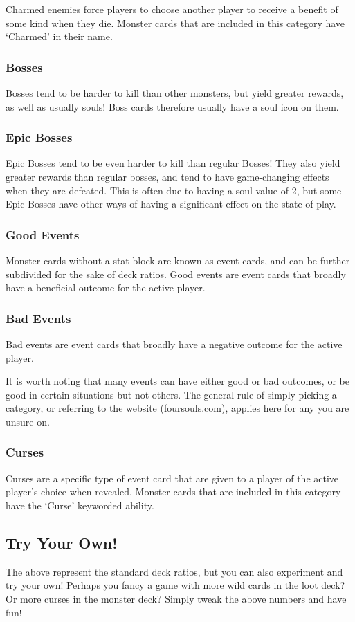 \documentclass[10pt, a4paper, twoside]{article} %
\begin{document}
    Charmed enemies force players to choose another player to receive a benefit of some kind when they die. Monster cards that are included in this category have ‘Charmed’ in their name.
    \subsubsection*{Bosses}
    Bosses tend to be harder to kill than other monsters, but yield greater rewards, as well as usually souls! Boss cards therefore usually have a soul icon on them.
    \subsubsection*{Epic Bosses}
    Epic Bosses tend to be even harder to kill than regular Bosses! They also yield greater rewards than regular bosses, and tend to have game-changing effects when they are defeated. This is often due to having a soul value of 2, but some Epic Bosses have other ways of having a significant effect on the state of play.
    \subsubsection*{Good Events}
    Monster cards without a stat block are known as event cards, and can be further subdivided for the sake of deck ratios. Good events are event cards that broadly have a beneficial outcome for the active player.
    \subsubsection*{Bad Events}
    Bad events are event cards that broadly have a negative outcome for the active player.
    
    It is worth noting that many events can have either good or bad outcomes, or be good in certain situations but not others. The general rule of simply picking a category, or referring to the website (foursouls.com), applies here for any you are unsure on.
    \subsubsection*{Curses}
    Curses are a specific type of event card that are given to a player of the active player’s choice when revealed. Monster cards that are included in this category have the ‘Curse’ keyworded ability.
    \subsection{Try Your Own!}
    The above represent the standard deck ratios, but you can also experiment and try your own! Perhaps you fancy a game with more wild cards in the loot deck? Or more curses in the monster deck? Simply tweak the above numbers and have fun!
\end{document}

